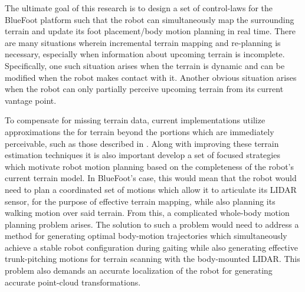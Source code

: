 	The ultimate goal of this research is to design a set of control-laws for the BlueFoot platform such that the robot can simultaneously map the surrounding terrain and update its foot placement/body motion planning in real time. There are many situations wherein incremental terrain mapping and re-planning is necessary, especially when information about upcoming terrain is incomplete. Specifically, one such situation arises when the terrain is dynamic and can be modified when the robot makes contact with it. Another obvious situation arises when the robot can only partially perceive upcoming terrain from its current vantage point.

	To compensate for missing terrain data, current implementations utilize approximations the for terrain beyond the portions which are immediately perceivable, such as those described in \cite{Kolter2009}. Along with improving these terrain estimation techniques it is also important develop a set of focused strategies which motivate robot motion planning based on the completeness of the robot's current terrain model. In BlueFoot's case, this would mean that the robot would need to plan a coordinated set of motions which allow it to articulate its LIDAR sensor, for the purpose of effective terrain mapping, while also planning its walking motion over said terrain. From this, a complicated whole-body motion planning problem arises. The solution to such a problem would need to address a method for generating optimal body-motion trajectories which simultaneously achieve a stable robot configuration during gaiting while also generating effective trunk-pitching motions for terrain scanning with the body-mounted LIDAR. This problem also demands an accurate localization of the robot for generating accurate point-cloud transformations. %


